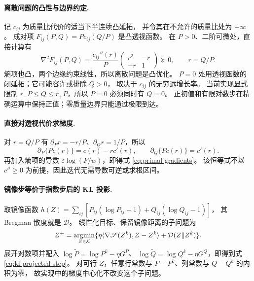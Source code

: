 \documentclass[UTF8,a4paper,11pt,fontset=fandol]{ctexart}
\begin{document}
\paragraph{离散问题的凸性与边界约定.}
记 $c_{ij}$ 为质量比代价的适当下半连续凸延拓，
并令其在不允许的质量比处为 $+\infty$。
成对项 $F_{ij}(P,Q)=Pc_{ij}(Q/P)$ 是凸透视函数。
在 $P>0$、二阶可微处，直接计算有
\begin{equation}
\nabla^2F_{ij}(P,Q)
=\frac{c_{ij}''(r)}{P}
\begin{pmatrix}r^2&-r\\-r&1\end{pmatrix}\succeq0,
\qquad r=Q/P.
\end{equation}
熵项也凸，两个边缘约束线性，所以离散问题是凸优化。
$P=0$ 处用透视函数的闭延拓；它可能容许或排除 $Q>0$，
取决于 $c_{ij}$ 的无穷远增长率。
当前实现显式限制 $r_-P\le Q\le r_+P$，所以 $P=0$ 必须同时有 $Q=0$。
正初值和有限对数步在精确运算中保持正值；零质量边界只能通过极限到达。

\paragraph{直接对透视代价求梯度.}
对 $r=Q/P$ 有 $\partial_Pr=-r/P$、$\partial_Qr=1/P$，所以
\begin{equation}
\partial_P\{Pc(r)\}=c(r)-rc'(r),\qquad
\partial_Q\{Pc(r)\}=c'(r).
\end{equation}
再加入熵项的导数 $\varepsilon\log(P/w)$，即得式 \eqref{eq:primal-gradients}。
该恒等式不以 $c''\ge0$ 为前提，因此迭代无需导数可逆或求根区间。

\paragraph{镜像步等价于指数步后的 KL 投影.}
取镜像函数 $h(Z)=\sum_{ij}[P_{ij}(\log P_{ij}-1)+Q_{ij}(\log Q_{ij}-1)]$，
其 Bregman 散度就是 $\mathcal D$。
线性化目标、保留镜像距离的子问题为
\begin{equation}
Z^+=\mathop{\rm argmin}_{Z\in\mathcal K}
\{\eta\langle\nabla\mathscr S(Z^k),Z-Z^k\rangle
+\mathcal D(Z\Vert Z^k)\}.
\label{eq:mirror-prox-subproblem}
\end{equation}
展开对数项并配入 $\log\widetilde P=\log P^k-\eta G^P$、
$\log\widetilde Q=\log Q^k-\eta G^Q$，即得到式 \eqref{eq:kl-projected-step}。
对可行 $Z$，任意行常数与 $P-P^k$、列常数与 $Q-Q^k$ 的内积为零，
故实现中的梯度中心化不改变这个子问题。
\end{document}

